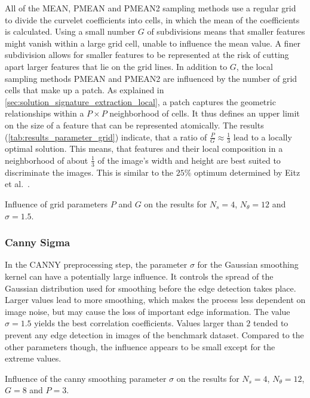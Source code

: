 All of the MEAN, PMEAN and PMEAN2 sampling methods use a regular grid to divide
the curvelet coefficients into cells, in which the mean of the coefficients is
calculated. Using a small number $G$ of subdivisions means that smaller
features might vanish within a large grid cell, unable to influence the mean
value. A finer subdivision allows for smaller features to be represented at the
risk of cutting apart larger features that lie on the grid lines. In addition
to $G$, the local sampling methods PMEAN and PMEAN2 are influenced by the
number of grid cells that make up a patch. As explained in
\autoref{sec:solution_signature_extraction_local}, a patch captures the
geometric relationships within a $P \times P$ neighborhood of cells. It thus
defines an upper limit on the size of a feature that can be represented
atomically. The results (\autoref{tab:results_parameter_grid}) indicate, that a
ratio of $\frac{P}{G} \approx \frac{1}{3}$ lead to a locally optimal solution.
This means, that features and their local composition in a neighborhood of
about $\frac{1}{3}$ of the image's width and height are best suited to
discriminate the images. This is similar to the $25\%$ optimum determined by
Eitz et al.\ \autocite{eitz_sketch-based_2010}.

\begin{table}[h]
    \centering
    \resultsparametergrid
    \caption[Grid Size Parameter Results]{
        Influence of grid parameters $P$ and $G$ on the results for $N_s=4$,
        $N_{\theta}=12$ and $\sigma=1.5$.
    }
    \label{tab:results_parameter_grid}
\end{table}

\FloatBarrier
\subsubsection{Canny Sigma}

In the CANNY preprocessing step, the parameter $\sigma$ for the Gaussian
smoothing kernel can have a potentially large influence. It controls the spread
of the Gaussian distribution used for smoothing before the edge detection takes
place. Larger values lead to more smoothing, which makes the process less
dependent on image noise, but may cause the loss of important edge information.
The value $\sigma = 1.5$ yields the best correlation coefficients. Values
larger than $2$ tended to prevent any edge detection in images of the benchmark
dataset. Compared to the other parameters though, the influence appears to be
small except for the extreme values.

\begin{table}[h]
    \centering
    \resultsparametercanny
    \caption[Canny Parameter Results]{
        Influence of the canny smoothing parameter $\sigma$ on the results for
        $N_s=4$, $N_{\theta}=12$, $G=8$ and $P=3$.
    }
    \label{tab:results_parameter_canny}
\end{table}

\FloatBarrier
